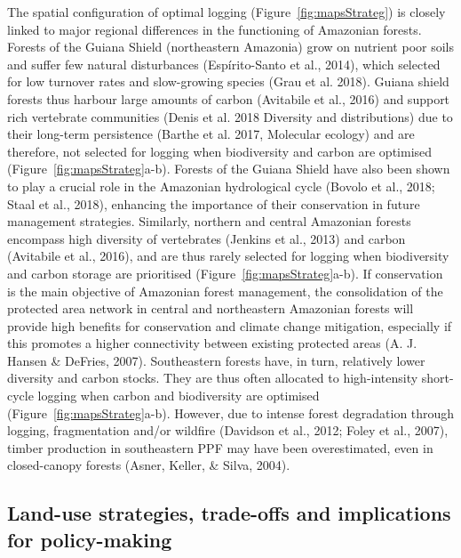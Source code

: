 \documentclass{article}
\begin{document}
The spatial configuration of optimal logging (Figure~\ref{fig:mapsStrateg}) is closely linked to major regional differences in the functioning of Amazonian forests. Forests of the Guiana Shield (northeastern Amazonia) grow on nutrient poor soils and suffer few natural disturbances (Espírito-Santo et al., 2014), which selected for low turnover rates and slow-growing species (Grau et al. 2018). Guiana shield forests thus harbour large amounts of carbon (Avitabile et al., 2016) and support rich vertebrate communities (Denis et al. 2018 Diversity and distributions) due to their long-term persistence (Barthe et al. 2017, Molecular ecology) and are therefore, not selected for logging when biodiversity and carbon are optimised (Figure~\ref{fig:mapsStrateg}a-b). Forests of the Guiana Shield have also been shown to play a crucial role in the Amazonian hydrological cycle (Bovolo et al., 2018; Staal et al., 2018), enhancing the importance of their conservation in future management strategies. Similarly, northern and central Amazonian forests encompass high diversity of vertebrates (Jenkins et al., 2013) and carbon (Avitabile et al., 2016), and are thus rarely selected for logging when biodiversity and carbon storage are prioritised (Figure~\ref{fig:mapsStrateg}a-b). If conservation is the main objective of Amazonian forest management, the consolidation of the protected area network in central and northeastern Amazonian forests will provide high benefits for conservation and climate change mitigation, especially if this promotes a higher connectivity between existing protected areas (A. J. Hansen & DeFries, 2007). Southeastern forests have, in turn, relatively lower diversity and carbon stocks. They are thus often allocated to high-intensity short-cycle logging when carbon and biodiversity are optimised (Figure~\ref{fig:mapsStrateg}a-b). However, due to intense forest degradation through logging, fragmentation and/or wildfire (Davidson et al., 2012; Foley et al., 2007), timber production in southeastern PPF may have been overestimated, even in closed-canopy forests (Asner, Keller, & Silva, 2004).
 
\subsection{Land-use strategies, trade-offs and implications for policy-making}
\end{document}
